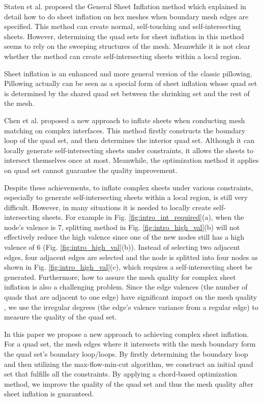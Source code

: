 \documentclass[final,5p,times,twocolumn]{elsarticle}
\begin{document}
Staten et al. proposed the General Sheet Inflation method which explained in detail how to do sheet inflation on hex meshes when boundary mesh edges are specified\cite{Staten:2009bo}. This method can create normal, self-touching and self-intersecting sheets. However, determining the quad sets for sheet inflation in this method seems to rely on the sweeping structures of the mesh. Meanwhile it is not clear whether the method can create self-intersecting sheets within a local region.

Sheet inflation is an enhanced and more general version of the classic pillowing. Pillowing actually can be seen as a special form of sheet inflation whose quad set is determined by the shared quad set between the shrinking set and the rest of the mesh.

Chen et al. proposed a new approach to inflate sheets when conducting mesh matching on complex interfaces\cite{Chen:2015kf}. This method firstly constructs the boundary loop of the quad set, and then determines the interior quad set. Although it can locally generate self-intersecting sheets under constraints, it allows the sheets to intersect themselves once at most. Meanwhile, the optimization method it applies on quad set cannot guarantee the quality improvement.

Despite these achievements, to inflate complex sheets under various constraints, especially to generate self-intersecting sheets within a local region, is still very difficult. However, in many situations it is needed to locally create self-intersecting sheets. For example in Fig. \ref{fig:intro_int_required}(a), when the node's valence is 7, splitting method in Fig. \ref{fig:intro_high_val}(b) will not effectively reduce the high valence since one of the new nodes still has a high valence of 6 (Fig. \ref{fig:intro_high_val}(b)). Instead of selecting two adjacent edges, four adjacent edges are selected and the node is splitted into four nodes as shown in Fig. \ref{fig:intro_high_val}(c), which requires a self-intersecting sheet be generated. Furthermore, how to assure the mesh quality for complex sheet inflation is also a challenging problem. Since the edge valences (the number of quads that are adjacent to one edge) have significant impact on the mesh quality \cite{Staten2010d}, we use the irregular degrees (the edge's valence variance from a regular edge)\cite{Chen:2015kf} to measure the quality of the quad set.

In this paper we propose a new approach to achieving complex sheet inflation. For a quad set, the mesh edges where it intersects with the mesh boundary form the quad set's boundary loop/loops. By firstly determining the boundary loop and then utilizing the max-flow-min-cut algorithm, we construct an initial quad set that fulfills all the constraints. By applying a chord-based optimization method, we improve the quality of the quad set and thus the mesh quality after sheet inflation is guaranteed.
\end{document}
